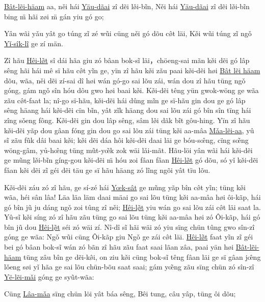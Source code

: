 \documentclass[twoside,twocolumn,a4paper,10pt]{memoir}
\begin{document}
\begin{scripture}
		\begin{poetry}
			\underline{Bât-lẽi-häam} aa, n\v{e}i hái \underline{Yäu-dãai} zî dẽi l\v{\o{}}i-bĩn,
			N\v{e}i hái \underline{Yäu-dãai} zî dẽi l\v{\o{}}i-bĩn bing \"{m} hãi z\o{}i \"{m} gán yiu	gó go;
			
			Yân wãi y\v{a}u yât go túng zĩ zé wũi cüng n\v{e}i gó dõu c\^{\o{}}t läi,
			K\v{\o{}}i wũi túng zĩ ng\v{o} \underline{Y\v{i}-sîk-lĩ} ge zí män.
		\end{poetry}
		
		Zî hãu \underline{Hêi-l\~{\o{}}t} sî dái hãa giu zó bâan bok-sĩ läi，chöeng-sai mãn k\v{\o{}}i dẽi gó lâp sêng hãi hái mê sï hãu c\^{\o{}}t yĩn ge, yïn zî hãu k\v{\o{}}i zãu paai k\v{\o{}}i-dẽi h\o{}i \underline{Bât lẽi häam} dõu, wãa, n\v{e}i dẽi zí-sai dî h\o{}i wán gó-go sai lõu zái, wán dou zî hãu tüng ng\v{o} góng, gám ng\v{o} sîn hóu dôu gwo h\o{}i baai k\v{\o{}}i.  
		K\v{\o{}}i-dẽi têng yün gwok-wöng ge wãa zãu c\^{\o{}}t-faat la; nî-go sï-hãu, k\v{\o{}}i-dẽi hái dûng mĩn ge sï-hãu gin dou ge gó lâp sêng häang hái k\v{\o{}}i-dẽi cïn bĩn, yât zĩk häang dou sai lõu zái gó bîn sîn tïng hái zîng s\v{o}eng fông.
		K\v{\o{}}i-dẽi gin dou lâp sêng, sâm l\v{\o{}}i dãk bĩt gôu-hing.
		Yïn zî hãu k\v{\o{}}i-dẽi yãp dou gâan fóng gin dou go sai lõu zái tüng k\v{\o{}}i aa-mâa \underline{M\v{a}a-lẽi-aa}, yû sĩ zãu fũk dâi baai k\v{\o{}}i; k\v{\o{}}i dẽi dáa hôi k\v{\o{}}i-dẽi daai läi ge bóu-s\^{œ}ng, cïng s\~{œ}ng wöng-gâm, yủ-h\^{œ}ng tüng mũt-y\~{œ}k zok wäi l\v{a}i-mãt.
		Hãu-löi yân wãi  hái k\v{\o{}}i-dẽi ge mũng l\v{\o{}}i-bĩn gíng-gou k\v{\o{}}i-dẽi \"{m} hóu zoi fâan fâan \underline{Hêi-l\~{\o{}}t} gó dõu, só y\v{i} k\v{\o{}}i-dẽi fâan k\v{\o{}}i dẽi zĩ géi dẽi täu ge sï hãu häang zó lĩng ngõi yât tïu lõu.
		
		K\v{\o{}}i-dẽi záu zó zî hãu,  ge sí-zé hái \underline{Y\oe{}k-sât} ge mũng yãp bîn c\^{\o{}}t yĩn; tüng k\v{\o{}}i wãa, héi sân lâa! Läa läa läm daai mäai go sai lõu tüng k\v{\o{}}i aa-mâa h\o{}i ôi-kãp, hái gó bîn jũ ju dáng ng\v{o} zoi tûng zî n\v{e}i; \underline{Hêi-l\~{\o{}}t} yiu wán go sai lõu zái c\^{\o{}}t läi saat la.
		Yû-sĩ k\v{\o{}}i síng zó zî hãu zãu tüng go sai lõu tüng k\v{\o{}}i aa-mâa h\o{}i zó Ôi-kãp,
		hái gó bîn jũ dou \underline{Hêi-l\~{\o{}}t} séi zó wäi zí. Nî-dî sĩ hãi wäi zó yiu sïng chün  tûng gwo sîn-zî góng ge wãa: Ng\v{o} wũi cüng Ôi-kãp giu Ng\v{o} ge zái c\^{\o{}}t läi.
		\underline{Hêi-l\~{\o{}}t} faat yĩn zĩ géi bei gó bâan bok-sĩ wán zó bãn zî hãu zãu faat saai lãan zâa, paai yän h\o{}i \underline{Bât-lẽi-häam} tüng zâu bîn ge dẽi-k\^{\o{}}i, on ziu k\v{\o{}}i cüng bok-sĩ têng fâan läi ge sï gâan j\^{œ}ng l\v{o}eng s\o{}i y\v{i} hãa ge sai lõu chün-bõu saat saai; 
		gám y\~{œ}ng zãu sïng chün zó sîn-zî \underline{Yë-lẽi-m\v{a}i} góng ge syũt-wãa:
		\begin{poetry}
			Cüng \underline{Lâa-m\v{a}a} sïng chün löi yât báa sêng,
			Bêi tung, câu yâp, tüng ôi dõu;
			

\end{poetry}
\end{scripture}
\end{document}
